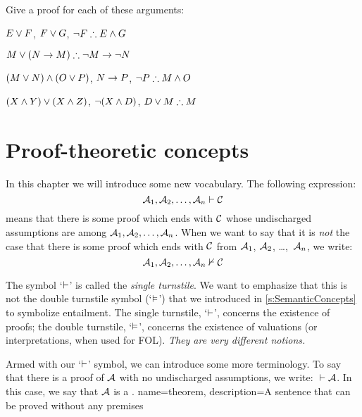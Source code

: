 \problempart 
Give a proof for each of these arguments:
\begin{compactlist}
\item $E\vee F$, $F\vee G$, $\enot F \therefore E \eand G$
\item $M\eor(N\eif M) \therefore \enot M \eif \enot N$
\item $(M \vee N) \wedge (O \vee P)$, $N \rightarrow P$, $\enot P \therefore M\eand O$
\item $(X\wedge Y)\vee(X\wedge Z)$, $\neg(X\wedge D)$, $D\eor M \therefore M$
\end{compactlist}



\chapter{Proof-theoretic concepts}\label{s:ProofTheoreticConcepts}

In this chapter we will introduce some new vocabulary. The following expression:
$$\mathcal{A}_1, \mathcal{A}_2, \ldots, \mathcal{A}_n \vdash \mathcal{C}$$
means that there is some proof which ends with $\mathcal{C}$ whose undischarged assumptions are among $\mathcal{A}_1, \mathcal{A}_2, \ldots, \mathcal{A}_n$. When we want to say that it is \emph{not} the case that there is some proof which ends with $\mathcal{C}$ from $\mathcal{A}_1$, $\mathcal{A}_2$, \dots,~$\mathcal{A}_n$, we write:  $$\mathcal{A}_1, \mathcal{A}_2, \ldots, \mathcal{A}_n \nvdash \mathcal{C}$$ 

The symbol `$\vdash$' is called the \emph{single turnstile}. We want to emphasize that this is not the {double turnstile} symbol (`$\vDash$') that we introduced in \cref{s:SemanticConcepts} to symbolize entailment. The single turnstile, `$\vdash$', concerns the existence of proofs; the double turnstile, `$\vDash$', concerns the existence of valuations (or interpretations, when used for FOL). \emph{They are very different notions.}

Armed with our `$\vdash$' symbol, we can introduce some more terminology. To say that there is a proof of $\mathcal{A}$ with no undischarged assumptions, we write: ${} \vdash \mathcal{A}$. In this case, we say that $\mathcal{A}$ is a .
{
name=theorem,
description={A sentence that can be proved without any premises}
}


